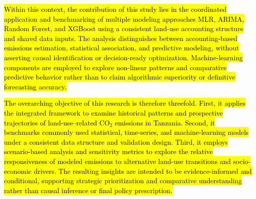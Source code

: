 \documentclass[10pt,letterpaper]{article}
\begin{document}
\hl{Within this context, the contribution of this study lies in the coordinated application and benchmarking of multiple modeling approaches MLR, ARIMA, Random Forest, and XGBoost using a consistent land-use accounting structure and shared data inputs. The analysis distinguishes between accounting-based emissions estimation, statistical association, and predictive modeling, without asserting causal identification or decision-ready optimization. Machine-learning components are employed to explore non-linear patterns and comparative predictive behavior rather than to claim algorithmic superiority or definitive forecasting accuracy.}

\hl{The overarching objective of this research is therefore threefold. First, it applies the integrated framework to examine historical patterns and prospective trajectories of land-use--related CO$_2$ emissions in Tanzania. Second, it benchmarks commonly used statistical, time-series, and machine-learning models under a consistent data structure and validation design. Third, it employs scenario-based analysis and sensitivity metrics to explore the relative responsiveness of modeled emissions to alternative land-use transitions and socio-economic drivers. The resulting insights are intended to be evidence-informed and conditional, supporting strategic prioritization and comparative understanding rather than causal inference or final policy prescription.}
\end{document}
